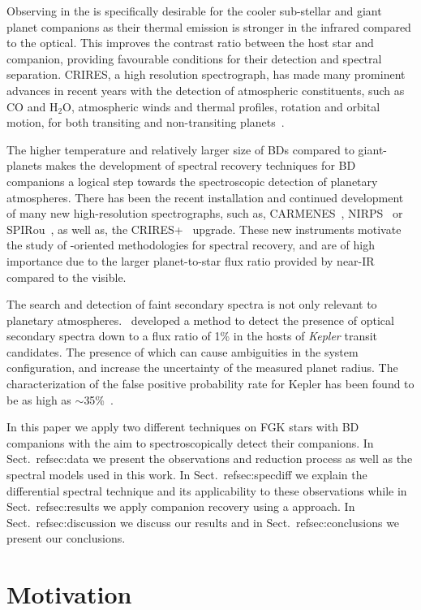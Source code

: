 Observing in the \nir{}is specifically desirable for the cooler sub-stellar and giant planet companions as their thermal emission is stronger in the infrared compared to the optical. This improves the contrast ratio between the host star and companion, providing favourable conditions for their detection and spectral separation. CRIRES, a high resolution \nir{}spectrograph, has made many prominent advances in recent years with the detection of atmospheric constituents, such as \(\textrm{CO} \) and \(\textrm{H}_{2}\textrm{O} \), atmospheric winds and thermal profiles, rotation and orbital motion, for both transiting and non-transiting planets~\citep[e.g.][]{snellen_orbital_2010, brogi_signature_2012, rodler_weighing_2012, dekok_detection_2013, brogi_carbon_2014, snellen_fast_2014, piskorz_evidence_2016, brogi_rotation_2016, birkby_discovery_2017}.

The higher temperature and relatively larger size of BDs compared to giant-planets makes the development of spectral recovery techniques for BD companions a logical step towards the spectroscopic detection of planetary atmospheres. There has been the recent installation and continued development of many new high-resolution \nir{}spectrographs, such as, {CARMENES}~\citep{quirrenbach_carmenes_2014}, NIRPS~\citep{bouchy_nearinfrared_2017} or SPIRou~\citep{artigau_spirou_2014}, as well as, the CRIRES+~\citep{dorn_crires_2016} upgrade. These new instruments motivate the study of \nir{}-oriented methodologies for spectral recovery, and are of high importance due to the larger planet-to-star flux ratio provided by near-IR compared to the visible.

{\rd{} The search and detection of faint secondary spectra is not only relevant to planetary atmospheres.~\citet{kolbl_detection_2015} developed a method to detect the presence of optical secondary spectra down to a flux ratio of 1\% in the hosts of \emph{Kepler} transit candidates. The presence of which can cause ambiguities in the system configuration, and increase the uncertainty of the measured planet radius. The characterization of the false positive probability rate for Kepler has been found to be as high as  \(\sim\)35\%~\citet{santerne_sophie_2012}.}

In this paper we apply two different techniques on FGK stars with BD companions with the aim to spectroscopically detect their companions. In Sect.~ref{sec:data} we present the observations and reduction process as well as the spectral models used in this work. In Sect.~ref{sec:specdiff} we explain the differential spectral technique and its applicability to these observations while in Sect.~ref{sec:results} we apply companion recovery using a \textchisquared approach. In Sect.~ref{sec:discussion} we discuss our results and in Sect.~ref{sec:conclusions} we present our conclusions.



\section{Motivation}
